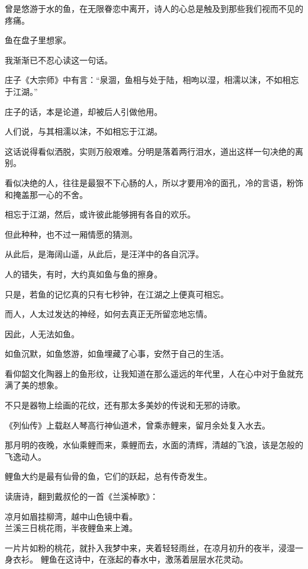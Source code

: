 \documentclass[12pt,a4paper]{article}
\def\blankrev{\vspace{1ex}}									%
\begin{document}
		\blankrev
		曾是悠游于水的鱼，在无限眷恋中离开，诗人的心总是触及到那些我们视而不见的疼痛。\par
		鱼在盘子里想家。\par
		我渐渐已不忍心读这一句话。

		\blankrev
		庄子《大宗师》中有言：“泉涸，鱼相与处于陆，相呴以湿，相濡以沫，不如相忘于江湖。”\par
		庄子的话，本是论道，却被后人引做他用。

		\blankrev
		人们说，与其相濡以沫，不如相忘于江湖。

		\blankrev
		这话说得看似洒脱，实则万般艰难。分明是落着两行泪水，道出这样一句决绝的离别。\par
		看似决绝的人，往往是最狠不下心肠的人，所以才要用冷的面孔，冷的言语，粉饰和掩盖那一心的不舍。\par
		相忘于江湖，然后，或许彼此能够拥有各自的欢乐。\par
		但此种种，也不过一厢情愿的猜测。\par
		从此后，是海阔山遥，从此后，是汪洋中的各自沉浮。

		\blankrev
		人的错失，有时，大约真如鱼与鱼的擦身。\par
		只是，若鱼的记忆真的只有七秒钟，在江湖之上便真可相忘。\par
		而人，人太过发达的神经，如何去真正无所留恋地忘情。

		\blankrev
		因此，人无法如鱼。\par
		如鱼沉默，如鱼悠游，如鱼埋藏了心事，安然于自己的生活。

		\blankrev
		看仰韶文化陶器上的鱼形纹，让我知道在那么遥远的年代里，人在心中对于鱼就充满了美的想象。\par
		不只是器物上绘画的花纹，还有那太多美妙的传说和无邪的诗歌。

		《列仙传》上载赵人琴高行神仙道术，曾乘赤鲤来，留月余处复入水去。\par
		那月明的夜晚，水仙乘鲤而来，乘鲤而去，水面的清辉，清越的飞浪，该是怎般的飞逸动人。

		鲤鱼大约是最有仙骨的鱼，它们的跃起，总有传奇发生。

		读唐诗，翻到戴叔伦的一首《兰溪棹歌》：

		\shortpoem{}{}{}
		凉月如眉挂柳湾，越中山色镜中看。\\
		兰溪三日桃花雨，半夜鲤鱼来上滩。\\
		\endshortpoem

		一片片如粉的桃花，就扑入我梦中来，夹着轻轻雨丝，在凉月初升的夜半，浸湿一身衣衫。
		鲤鱼在这诗中，在涨起的春水中，激荡着层层水花灵动。
\end{document}
